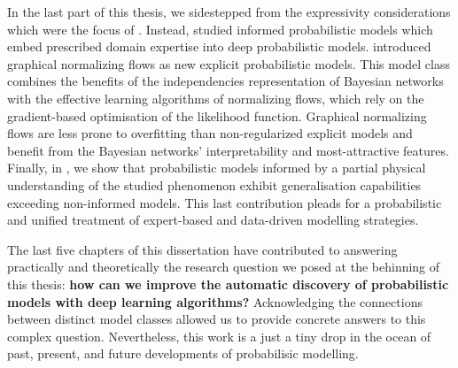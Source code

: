 In the last part of this thesis, we sidestepped from the expressivity considerations which were the focus of . Instead,  studied informed probabilistic models which embed prescribed domain expertise into deep probabilistic models.  introduced graphical normalizing flows as new explicit probabilistic models. This model class combines the benefits of the independencies representation of Bayesian networks with the effective learning algorithms of normalizing flows, which rely on the gradient-based optimisation of the likelihood function. Graphical normalizing flows are less prone to overfitting than non-regularized explicit models and benefit from the Bayesian networks' interpretability and most-attractive features. Finally, in , we show that probabilistic models informed by a partial physical understanding of the studied phenomenon exhibit generalisation capabilities exceeding non-informed models. This last contribution pleads for a probabilistic and unified treatment of expert-based and data-driven modelling strategies.

The last five chapters of this dissertation have contributed to answering practically and theoretically the research question we posed at the behinning of this thesis: \textbf{how can we improve the automatic discovery of probabilistic models with deep learning algorithms?} Acknowledging the connections between distinct model classes allowed us to provide concrete answers to this complex question. Nevertheless, this work is a just a tiny drop in the ocean of past, present, and future developments of probabilisic modelling.

